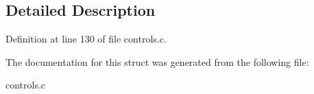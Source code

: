 \subsection{Detailed Description}


Definition at line 130 of file controls.\+c.



The documentation for this struct was generated from the following file\+:\begin{DoxyCompactItemize}
\item 
controls.\+c\end{DoxyCompactItemize}
